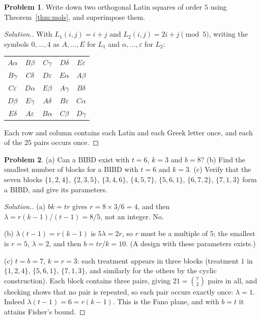 \documentclass[11pt,a4paper]{article}
\numberwithin{equation}{section}
\theoremstyle{definition}
\newtheorem{problemx}{Problem}[subsection]
\newenvironment{problem}{\begin{problemx}}{\end{problemx}}
\newenvironment{solution}
  {\renewcommand{\qedsymbol}{}\begin{proof}[\textit{Solution}.]}
  {\end{proof}}
\begin{document}
\begin{problem}
Write down two orthogonal Latin squares of order $5$ using Theorem~\ref{thm:mols}, and superimpose them.
\end{problem}

\begin{solution}
With $L_1(i, j) = i + j$ and $L_2(i, j) = 2i + j \pmod 5$, writing the symbols $0, \dots, 4$ as $A, \dots, E$ for $L_1$ and $\alpha, \dots, \varepsilon$ for $L_2$:
\begin{center}
\begin{tabular}{ccccc}
$A\alpha$ & $B\beta$ & $C\gamma$ & $D\delta$ & $E\varepsilon$ \\
$B\gamma$ & $C\delta$ & $D\varepsilon$ & $E\alpha$ & $A\beta$ \\
$C\varepsilon$ & $D\alpha$ & $E\beta$ & $A\gamma$ & $B\delta$ \\
$D\beta$ & $E\gamma$ & $A\delta$ & $B\varepsilon$ & $C\alpha$ \\
$E\delta$ & $A\varepsilon$ & $B\alpha$ & $C\beta$ & $D\gamma$
\end{tabular}
\end{center}
Each row and column contains each Latin and each Greek letter once, and each of the $25$ pairs occurs once.
\end{solution}

\begin{problem}
(a) Can a BIBD exist with $t = 6$, $k = 3$ and $b = 8$? (b) Find the smallest number of blocks for a BIBD with $t = 6$ and $k = 3$. (c) Verify that the seven
blocks $\{1,2,4\}$, $\{2,3,5\}$, $\{3,4,6\}$, $\{4,5,7\}$, $\{5,6,1\}$, $\{6,7,2\}$, $\{7,1,3\}$ form a BIBD, and give its parameters.
\end{problem}

\begin{solution}
(a) $bk = tr$ gives $r = 8 \times 3/6 = 4$, and then $\lambda = r(k - 1)/(t - 1) = 8/5$, not an integer. No.

(b) $\lambda(t - 1) = r(k - 1)$ is $5\lambda = 2r$, so $r$ must be a multiple of $5$; the smallest is $r = 5$, $\lambda = 2$, and then $b = tr/k = 10$. (A design with these
parameters exists.)

(c) $t = b = 7$, $k = r = 3$: each treatment appears in three blocks (treatment $1$ in $\{1,2,4\}$, $\{5,6,1\}$, $\{7,1,3\}$, and similarly for the others by the cyclic
construction). Each block contains three pairs, giving $21 = \binom72$ pairs in all, and checking shows that no pair is repeated, so each pair occurs exactly
once: $\lambda = 1$. Indeed $\lambda(t - 1) = 6 = r(k - 1)$. This is the Fano plane, and with $b = t$ it attains Fisher's bound.
\end{solution}
\end{document}
